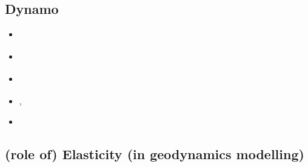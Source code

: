 \subsection{Dynamo}

\begin{scriptsize}
\begin{itemize}
\item[\twothousandfive] \textcite{haha05}
\item[\twothousandnine] \textcite{rolm09}
\item[\twothousandeleven] \textcite{jone11}
\item[\twothousandthirteen] \textcite{erhh13}, \textcite{vagc13}
\item[\twothousandsixteen] \textcite{chah16}
\end{itemize}
\end{scriptsize}

\subsection{(role of) Elasticity (in geodynamics modelling)}

